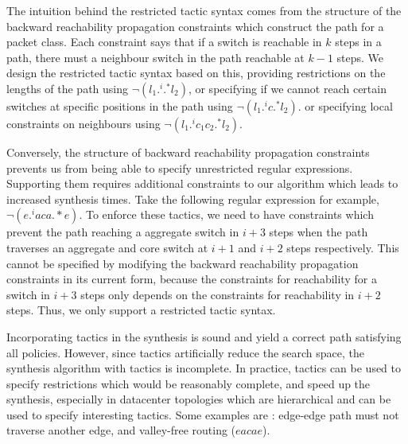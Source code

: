 The intuition behind the restricted tactic syntax comes from the structure of the backward reachability propagation 
constraints which construct the path for a packet class. Each constraint says that if a switch is reachable in $k$ steps in a path,
 there must a neighbour switch in the path reachable at $k-1$ steps. We design the restricted tactic syntax based
  on this, providing restrictions on the lengths of the path using $\neg (l_1 .^i .^* l_2)$, or specifying if we cannot 
  reach certain switches at specific positions in the path using  $\neg (l_1 .^i c .^* l_2)$. or specifying local 
  constraints on neighbours using $\neg (l_1  .^i c_1 c_2 .^* l_2)$.  
  
  Conversely, the structure of backward reachability propagation constraints 
  prevents us from being able to specify unrestricted regular expressions. Supporting them
  requires additional constraints to our algorithm which leads to increased synthesis times. 
  Take the following regular expression for example, $\neg(e .^i a c a .*e)$. To enforce
  these tactics, we need to have constraints which prevent the path reaching a aggregate switch in $i+3$
  steps when the path traverses an aggregate and core switch at $i+1$ and $i+2$ steps
  respectively. This cannot be specified by modifying the backward reachability propagation 
  constraints in its current form, 
  because the constraints for reachability for a switch in $i + 3$ steps only depends on 
  the constraints for reachability in $i+2$ steps. Thus, we only support a restricted tactic syntax.   

Incorporating tactics in the synthesis is sound and yield a correct path satisfying all policies.
 However, since tactics artificially reduce the search space, the synthesis algorithm with tactics is incomplete. 
 In practice, tactics can be used to specify restrictions which would be reasonably complete, 
 and speed up the synthesis, especially in datacenter topologies which are hierarchical 
 and can be used to specify interesting tactics. Some examples are : edge-edge path must not
 traverse another edge, and valley-free routing ($eacae$).

